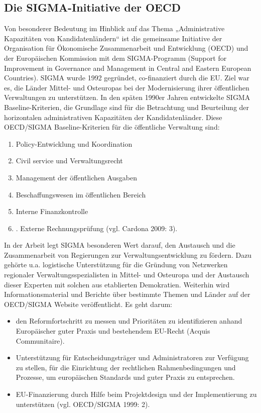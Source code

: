 \subsection{Die SIGMA-Initiative der OECD }

Von besonderer Bedeutung im Hinblick auf das Thema „Administrative Kapazitäten von Kandidatenländern“ ist die gemeinsame Initiative der Organisation für Ökonomische Zusammenarbeit und Entwicklung (OECD) und der Europäischen Kommission mit dem SIGMA-Programm (Support for Improvement in Governance and Management in Central and Eastern European Countries). SIGMA wurde 1992 gegründet, co-finanziert durch die EU. Ziel war es, die Länder Mittel- und Osteuropas bei der Modernisierung ihrer öffentlichen Verwaltungen zu unterstützen. In den späten 1990er Jahren entwickelte SIGMA Baseline-Kriterien, die Grundlage sind für die Betrachtung und Beurteilung der horizontalen administrativen Kapazitäten der Kandidatenländer. Diese OECD/SIGMA Baseline-Kriterien für die öffentliche Verwaltung sind: 
\begin{enumerate}
\item Policy-Entwicklung und Koordination 
\item Civil service und Verwaltungsrecht
\item Management der öffentlichen Ausgaben
\item Beschaffungswesen im öffentlichen Bereich
\item Interne Finanzkontrolle
\item. Externe Rechnungsprüfung (vgl. Cardona 2009: 3).
\end{enumerate}
In der Arbeit legt SIGMA besonderen Wert darauf, den Austausch und die Zusammenarbeit von Regierungen zur Verwaltungsentwicklung zu fördern. Dazu gehörte u.a. logistische Unterstützung für die Gründung von Netzwerken regionaler Verwaltungsspezialisten in Mittel- und Osteuropa und der Austausch dieser Experten mit solchen aus etablierten Demokratien. Weiterhin wird Informationsmaterial und Berichte über bestimmte Themen und Länder auf der OECD/SIGMA Website veröffentlicht. Es geht darum:
\begin{itemize}
\item den Reformfortschritt zu messen und Prioritäten zu identifizieren anhand Europäischer guter Praxis und bestehendem EU-Recht (Acquis Communitaire). 
\item Unterstützung für Entscheidungsträger und Administratoren zur Verfügung zu stellen, für die Einrichtung der rechtlichen Rahmenbedingungen und Prozesse, um europäischen Standards und guter Praxis zu entsprechen.
\item EU-Finanzierung durch Hilfe beim Projektdesign und der Implementierung zu unterstützen (vgl. OECD/SIGMA 1999: 2).
\end{itemize}
